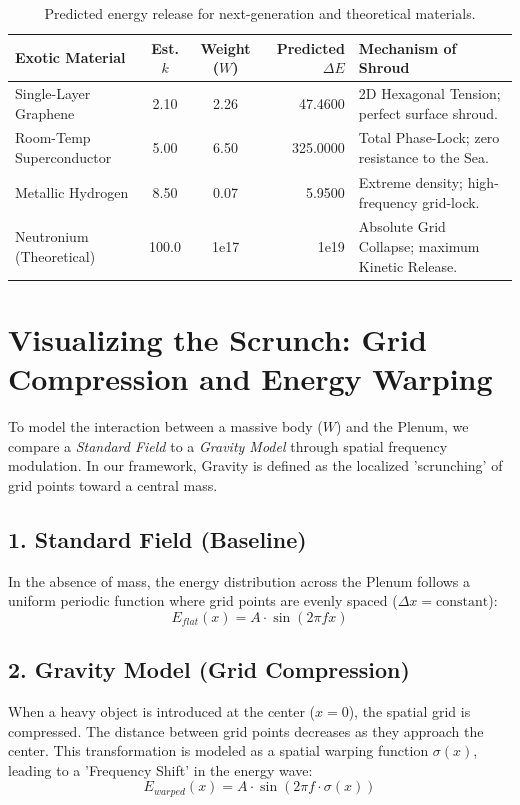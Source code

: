 \documentclass[11pt]{article}
\begin{document}
\begin{table}[h!]
\centering
\renewcommand{\arraystretch}{1.3}
\begin{tabular}{|l|c|c|r|p{4cm}|}
\hline
\textbf{Exotic Material} & \textbf{Est. $k$} & \textbf{Weight ($W$)} & \textbf{Predicted $\Delta E$} & \textbf{Mechanism of Shroud} \\ \hline
Single-Layer Graphene & 2.10 & 2.26 & 47.4600 & 2D Hexagonal Tension; perfect surface shroud. \\ \hline
Room-Temp Superconductor & 5.00 & 6.50 & 325.0000 & Total Phase-Lock; zero resistance to the Sea. \\ \hline
Metallic Hydrogen & 8.50 & 0.07 & 5.9500 & Extreme density; high-frequency grid-lock. \\ \hline
Neutronium (Theoretical) & 100.0 & 1e17 & 1e19 & Absolute Grid Collapse; maximum Kinetic Release. \\ \hline
\end{tabular}
\caption{Predicted energy release for next-generation and theoretical materials.}
\end{table}


\section*{Visualizing the Scrunch: Grid Compression and Energy Warping}

To model the interaction between a massive body ($W$) and the Plenum, we compare a \textit{Standard Field} to a \textit{Gravity Model} through spatial frequency modulation. In our framework, Gravity is defined as the localized 'scrunching' of grid points toward a central mass.

\subsection*{1. Standard Field (Baseline)}
In the absence of mass, the energy distribution across the Plenum follows a uniform periodic function where grid points are evenly spaced ($\Delta x = \text{constant}$):
\begin{equation}
    E_{flat}(x) = A \cdot \sin(2\pi f x)
\end{equation}

\subsection*{2. Gravity Model (Grid Compression)}
When a heavy object is introduced at the center ($x=0$), the spatial grid is compressed. The distance between grid points decreases as they approach the center. This transformation is modeled as a spatial warping function $\sigma(x)$, leading to a 'Frequency Shift' in the energy wave:
\begin{equation}
    E_{warped}(x) = A \cdot \sin\left(2\pi f \cdot \sigma(x)\right)
\end{equation}
\end{document}
